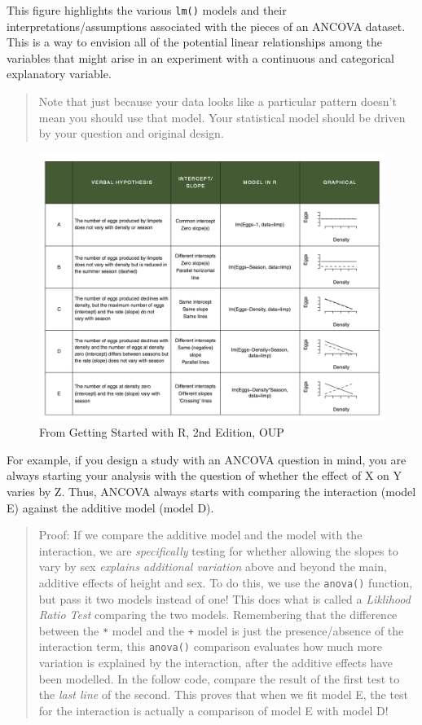 \documentclass[
]{book}
\begin{document}
This figure highlights the various \texttt{lm()} models and their interpretations/assumptions associated with the pieces of an ANCOVA dataset. This is a way to envision all of the potential linear relationships among the variables that might arise in an experiment with a continuous and categorical explanatory variable.

\begin{quote}
Note that just because your data looks like a particular pattern doesn't mean you should use that model. Your statistical model should be driven by your question and original design.
\end{quote}

\begin{figure}
\includegraphics[width=20.56in]{images/GSwithR_Grid} \caption{From Getting Started with R, 2nd Edition, OUP}\label{fig:unnamed-chunk-50}
\end{figure}

For example, if you design a study with an ANCOVA question in mind, you are always starting your analysis with the question of whether the effect of X on Y varies by Z. Thus, ANCOVA always starts with comparing the interaction (model E) against the additive model (model D).

\begin{quote}
Proof: If we compare the additive model and the model with the interaction, we are \emph{specifically} testing for whether allowing the slopes to vary by sex \emph{explains additional variation} above and beyond the main, additive effects of height and sex. To do this, we use the \texttt{anova()} function, but pass it two models instead of one! This does what is called a \emph{Liklihood Ratio Test} comparing the two models. Remembering that the difference between the \texttt{*} model and the \texttt{+} model is just the presence/absence of the interaction term, this \texttt{anova()} comparison evaluates how much more variation is explained by the interaction, after the additive effects have been modelled. In the follow code, compare the result of the first test to the \emph{last line} of the second. This proves that when we fit model E, the test for the interaction is actually a comparison of model E with model D!
\end{quote}
\end{document}
